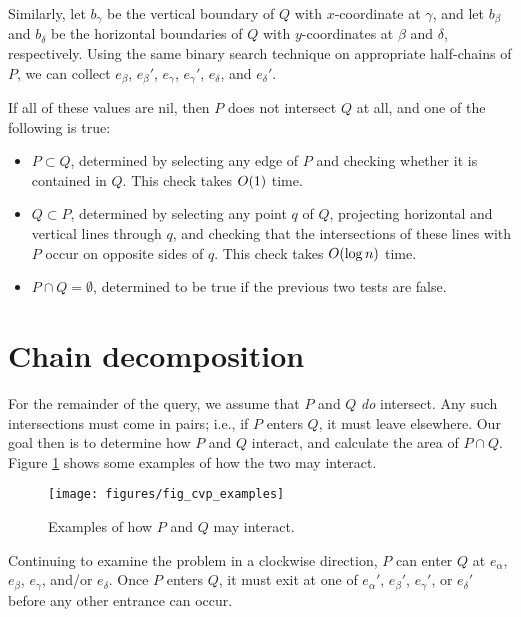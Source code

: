 Similarly, let $b_\gamma$ be the vertical boundary of $Q$ with $x$-coordinate at $\gamma$, and let $b_\beta$ and $b_\delta$ be the horizontal boundaries of $Q$ with $y$-coordinates at $\beta$ and $\delta$, respectively.  Using the same binary search technique on appropriate half-chains of $P$, we can collect $e_\beta$, $e_\beta'$, $e_\gamma$, $e_\gamma'$, $e_\delta$, and $e_\delta'$.  

If all of these values are nil, then $P$ does not intersect $Q$ at all, and one of the following is true:

\begin{itemize}
 \item $P \subset Q$, determined by selecting any edge of $P$ and checking whether it is contained in $Q$. This check takes $O\!\left(1\right)$ time.

 \item $Q \subset P$, determined by selecting any point $q$ of $Q$, projecting horizontal and vertical lines through $q$, and checking that the intersections of these lines with $P$ occur on opposite sides of $q$. This check takes $O\!\left(\log{n}\right)$ time.

 \item $P \cap Q = \emptyset$, determined to be true if the previous two tests are false.
\end{itemize}


\section{Chain decomposition}

For the remainder of the query, we assume that $P$ and $Q$ \emph{do} intersect. Any such intersections must come in pairs; i.e., if $P$ enters $Q$, it must leave elsewhere.  Our goal then is to determine how $P$ and $Q$ interact, and calculate the area of $P \cap Q$.  Figure \ref{fig:convexp:examples} shows some examples of how the two may interact.

\begin{figure}[t]
\begin{center}
  \texttt{[image: figures/fig\_cvp\_examples]}
  \caption{Examples of how $P$ and $Q$ may interact.}
  \label{fig:convexp:examples}
\end{center}
\end{figure}

Continuing to examine the problem in a clockwise direction, $P$ can enter $Q$ at $e_\alpha$, $e_\beta$, $e_\gamma$, and/or $e_\delta$.  Once $P$ enters $Q$, it must exit at one of $e_\alpha'$, $e_\beta'$, $e_\gamma'$, or $e_\delta'$ before any other entrance can occur.

